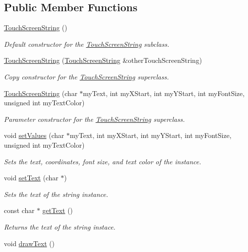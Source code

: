 \subsection*{Public Member Functions}
\begin{DoxyCompactItemize}
\item 
\hyperlink{class_touch_screen_string_ac6041c6c845b2286efee96cbc4b5473f}{Touch\+Screen\+String} ()
\begin{DoxyCompactList}\small\item\em Default constructor for the \hyperlink{class_touch_screen_string}{Touch\+Screen\+String} subclass. \end{DoxyCompactList}\item 
\hyperlink{class_touch_screen_string_a32ccd512fd5ef6a1aefa14d1e7552afb}{Touch\+Screen\+String} (\hyperlink{class_touch_screen_string}{Touch\+Screen\+String} \&other\+Touch\+Screen\+String)
\begin{DoxyCompactList}\small\item\em Copy constructor for the \hyperlink{class_touch_screen_string}{Touch\+Screen\+String} superclass. \end{DoxyCompactList}\item 
\hyperlink{class_touch_screen_string_a225634c4816f8988343c9a9491cf27fb}{Touch\+Screen\+String} (char $\ast$my\+Text, int my\+X\+Start, int my\+Y\+Start, int my\+Font\+Size, unsigned int my\+Text\+Color)
\begin{DoxyCompactList}\small\item\em Parameter constructor for the \hyperlink{class_touch_screen_string}{Touch\+Screen\+String} superclass. \end{DoxyCompactList}\item 
void \hyperlink{class_touch_screen_string_ad797bc5369aaace58de46bca39ae83dd}{set\+Values} (char $\ast$my\+Text, int my\+X\+Start, int my\+Y\+Start, int my\+Font\+Size, unsigned int my\+Text\+Color)
\begin{DoxyCompactList}\small\item\em Sets the text, coordinates, font size, and text color of the instance. \end{DoxyCompactList}\item 
void \hyperlink{class_touch_screen_string_a7d32e2262e4ea1009b029c0ae8b45897}{set\+Text} (char $\ast$)
\begin{DoxyCompactList}\small\item\em Sets the text of the string instance. \end{DoxyCompactList}\item 
const char $\ast$ \hyperlink{class_touch_screen_string_aadd13b945c6567a321a73f9e4220ee73}{get\+Text} ()
\begin{DoxyCompactList}\small\item\em Returns the text of the string instace. \end{DoxyCompactList}\item 
\hypertarget{class_touch_screen_string_a31873d10d7c6d9905048b76b969fa978}{void \hyperlink{class_touch_screen_string_a31873d10d7c6d9905048b76b969fa978}{draw\+Text} ()}\label{class_touch_screen_string_a31873d10d7c6d9905048b76b969fa978}


\end{DoxyCompactItemize}
